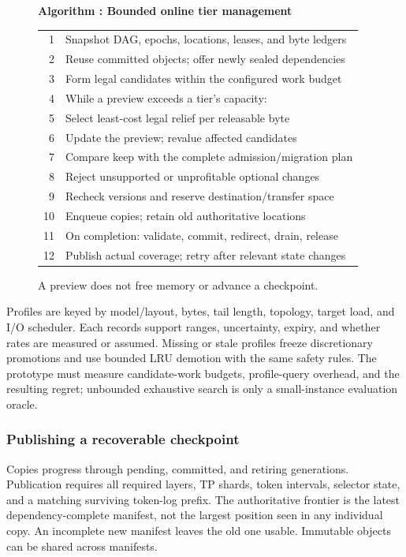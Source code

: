 \begin{figure}[t]
 \raggedright
 \label{alg:placement}
 \textbf{Algorithm \thedesignalgorithm: Bounded online tier management}
 \par\smallskip
 \begin{tabularx}{\columnwidth}{@{}r@{\quad}X@{}}
 \toprule
 1 & Snapshot DAG, epochs, locations, leases, and byte ledgers \\
 2 & Reuse committed objects; offer newly sealed dependencies \\
 3 & Form legal candidates within the configured work budget \\
 4 & While a preview exceeds a tier's capacity: \\
 5 & \quad Select least-cost legal relief per releasable byte \\
 6 & \quad Update the preview; revalue affected candidates \\
 7 & Compare keep with the complete admission/migration plan \\
 8 & Reject unsupported or unprofitable optional changes \\
 9 & Recheck versions and reserve destination/transfer space \\
 10 & Enqueue copies; retain old authoritative locations \\
 11 & On completion: validate, commit, redirect, drain, release \\
 12 & Publish actual coverage; retry after relevant state changes \\
 \bottomrule
 \end{tabularx}
 \caption*{A preview does not free memory or advance a checkpoint.}
\end{figure}

Profiles are keyed by model/layout, bytes, tail length, topology, target
load, and I/O scheduler. Each records support ranges, uncertainty, expiry,
and whether rates are measured or assumed. Missing or stale profiles
freeze discretionary promotions and use bounded LRU demotion with the
same safety rules. The prototype must measure candidate-work budgets,
profile-query overhead, and the resulting regret; unbounded exhaustive
search is only a small-instance evaluation oracle.

\subsubsection{Publishing a recoverable checkpoint}
\label{sec:checkpoint}
Copies progress through pending, committed, and retiring generations.
Publication requires all required layers, TP shards, token intervals,
selector state, and a matching surviving token-log prefix. The authoritative
frontier is the latest dependency-complete manifest, not the largest
position seen in any individual copy. An incomplete new manifest leaves
the old one usable. Immutable objects can be shared across manifests.

